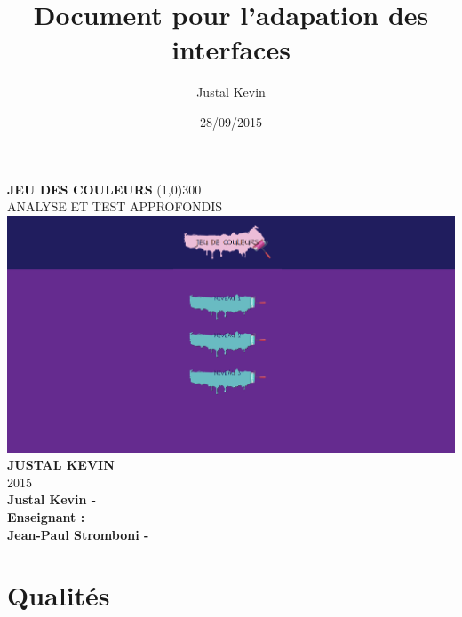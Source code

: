 \documentclass{article}
\title{Document pour l'adapation des interfaces}
\author{Justal Kevin}
\date{28/09/2015}
\begin{document}
\begin{center}
\textbf{\Huge{JEU DES COULEURS}}
\line(1,0){300}\\
ANALYSE ET TEST APPROFONDIS\\
\vspace{3cm}
\includegraphics[width=\textwidth]{2}\\
\vspace{3cm}
\textbf{\Large{JUSTAL KEVIN}}\\
2015\\
\vspace{2cm}
\textbf{Justal Kevin -  \color{black}{- SI5 - IHM}}\\
\vspace{4cm}
\textbf{Enseignant :}\\
\textbf{Jean-Paul Stromboni - }
\end{center}

\newpage
\tableofcontents

\newpage

\section{Qualit\'es}
\end{document}
